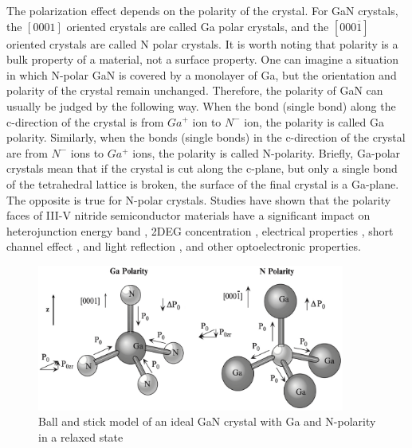 The polarization effect  depends on the polarity of the  crystal. For GaN crystals, the $[0001]$ oriented crystals are called Ga polar crystals, and the $[000\overline{1}]$ oriented crystals are called N polar crystals. It is worth noting that polarity is a bulk property of a material, not a surface  property. One can imagine a situation in which N-polar GaN is covered by a monolayer of Ga, but the orientation and polarity of the crystal  remain unchanged. Therefore, the polarity of GaN can usually be judged by the following way. When the bond (single bond) along the c-direction of the crystal is from $Ga^{+}$ ion to $N^{-}$ ion, the polarity is called Ga polarity. Similarly, when the bonds (single bonds) in the c-direction of the crystal are from $N^{-}$ ions to $Ga^{+}$ ions, the polarity is called N-polarity. Briefly, Ga-polar crystals mean that if the crystal is cut along the c-plane, but only a single bond of the tetrahedral lattice is broken, the surface of the final crystal is a Ga-plane. The opposite is true for N-polar crystals. Studies have shown that the polarity faces of III-V nitride  semiconductor materials have a significant impact on heterojunction energy band \cite{jang2002characterization}, 2DEG concentration \cite{dimitrov2000two}, electrical properties \cite{guerra2010comparison,dimitrov1999comparison}, short channel effect \cite{park2011simulation}, and light reflection \cite{buchheim2004photoreflectance}, and other optoelectronic properties.

\begin{figure}[H] 
\centering    
\includegraphics[width=0.9\textwidth]{ch2_1}
\caption[Ball and stick model of an ideal GaN crystal with Ga and N-polarity in a relaxed state]{Ball and stick model of an ideal GaN crystal with Ga and N-polarity in a relaxed state \protect\cite{morkoc2008polarization}}
\label{fig:2.1}
\end{figure}

